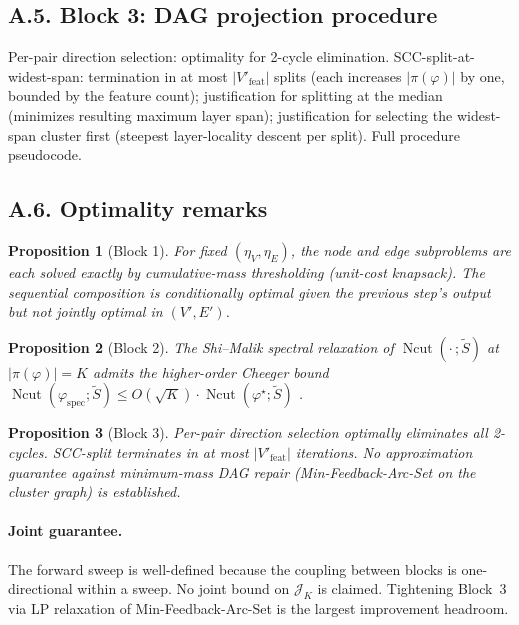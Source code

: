 \documentclass[table, 11pt]{article}
\newtheorem{proposition}{Proposition}
\DeclareMathOperator{\Ncut}{Ncut}
\begin{document}
\subsection*{A.5. Block 3: DAG projection procedure}\label{app:block3}

Per-pair direction selection: optimality for 2-cycle elimination.
SCC-split-at-widest-span: termination in at most $|V'_{\text{feat}}|$
splits (each increases $|\pi(\varphi)|$ by one, bounded by the
feature count); justification for splitting at the median (minimizes
resulting maximum layer span); justification for selecting the
widest-span cluster first (steepest layer-locality descent per
split). Full procedure pseudocode.

\subsection*{A.6. Optimality remarks}\label{app:optimality}

\begin{proposition}[Block 1]
For fixed $(\eta_V, \eta_E)$, the node and edge subproblems are each
solved exactly by cumulative-mass thresholding (unit-cost knapsack).
The sequential composition is conditionally optimal given the
previous step's output but not jointly optimal in $(V', E')$.
\end{proposition}

\begin{proposition}[Block 2]
The Shi--Malik spectral relaxation of $\Ncut(\cdot\,; \tilde S)$
at $|\pi(\varphi)| = K$ admits the higher-order Cheeger bound
$\Ncut(\varphi_{\text{spec}}; \tilde S) \le
O(\sqrt{K}) \cdot \Ncut(\varphi^\star; \tilde S)$
\cite{lee2014multiway}.
\end{proposition}

\begin{proposition}[Block 3]
Per-pair direction selection optimally eliminates all 2-cycles.
SCC-split terminates in at most $|V'_{\text{feat}}|$ iterations. No
approximation guarantee against minimum-mass DAG repair
(Min-Feedback-Arc-Set on the cluster graph) is established.
\end{proposition}

\paragraph{Joint guarantee.}
The forward sweep is well-defined because the coupling between
blocks is one-directional within a sweep. No joint bound on
$\mathcal{J}_K$ is claimed. Tightening Block~3 via LP relaxation of
Min-Feedback-Arc-Set is the largest improvement headroom.
\end{document}
